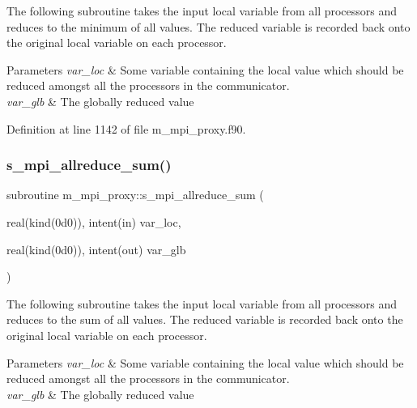 The following subroutine takes the input local variable from all processors and reduces to the minimum of all values. The reduced variable is recorded back onto the original local variable on each processor. 


\begin{DoxyParams}{Parameters}
{\em var\+\_\+loc} & Some variable containing the local value which should be reduced amongst all the processors in the communicator. \\
\hline
{\em var\+\_\+glb} & The globally reduced value \\
\hline
\end{DoxyParams}


Definition at line 1142 of file m\+\_\+mpi\+\_\+proxy.\+f90.

\mbox{\label{namespacem__mpi__proxy_a873520062481f3dabcfa77f9bd7728d3}} 
\subsubsection{\texorpdfstring{s\+\_\+mpi\+\_\+allreduce\+\_\+sum()}{s\_mpi\_allreduce\_sum()}}
{\footnotesize\ttfamily subroutine m\+\_\+mpi\+\_\+proxy\+::s\+\_\+mpi\+\_\+allreduce\+\_\+sum (\begin{DoxyParamCaption}\item[{real(kind(0d0)), intent(in)}]{var\+\_\+loc,  }\item[{real(kind(0d0)), intent(out)}]{var\+\_\+glb }\end{DoxyParamCaption})}



The following subroutine takes the input local variable from all processors and reduces to the sum of all values. The reduced variable is recorded back onto the original local variable on each processor. 


\begin{DoxyParams}{Parameters}
{\em var\+\_\+loc} & Some variable containing the local value which should be reduced amongst all the processors in the communicator. \\
\hline
{\em var\+\_\+glb} & The globally reduced value \\
\hline
\end{DoxyParams}


